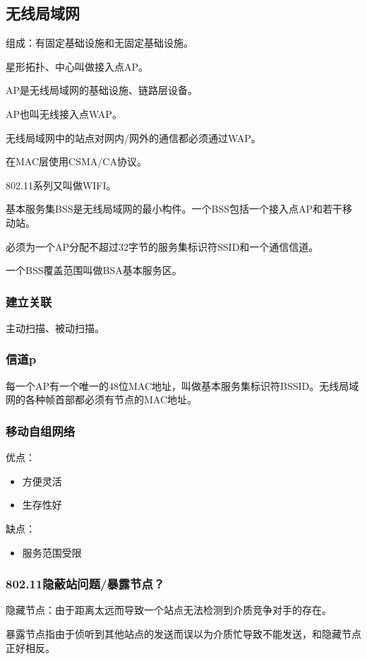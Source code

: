 \documentclass[11pt]{article}
\begin{document}
\subsection{无线局域网}
\label{sec:orgd8cb254}
组成：有固定基础设施和无固定基础设施。

星形拓扑、中心叫做接入点AP。

AP是无线局域网的基础设施、链路层设备。

AP也叫无线接入点WAP。

无线局域网中的站点对网内/网外的通信都必须通过WAP。

在MAC层使用CSMA/CA协议。

802.11系列又叫做WIFI。

基本服务集BSS是无线局域网的最小构件。一个BSS包括一个接入点AP和若干移动站。

必须为一个AP分配不超过32字节的服务集标识符SSID和一个通信信道。

一个BSS覆盖范围叫做BSA基本服务区。
\subsubsection{建立关联}
\label{sec:org15c4c9b}
主动扫描、被动扫描。
\subsubsection{信道p}
\label{sec:orgf0e7ae6}
每一个AP有一个唯一的48位MAC地址，叫做基本服务集标识符BSSID。无线局域网的各种帧首部都必须有节点的MAC地址。
\subsubsection{移动自组网络}
\label{sec:orga0523cc}

优点：
\begin{itemize}
\item 方便灵活
\item 生存性好
\end{itemize}
缺点：
\begin{itemize}
\item 服务范围受限
\end{itemize}
\subsubsection{802.11隐蔽站问题/暴露节点？}
\label{sec:org39e2bc2}
隐藏节点：由于距离太远而导致一个站点无法检测到介质竞争对手的存在。

暴露节点指由于侦听到其他站点的发送而误以为介质忙导致不能发送，和隐藏节点正好相反。
\end{document}
